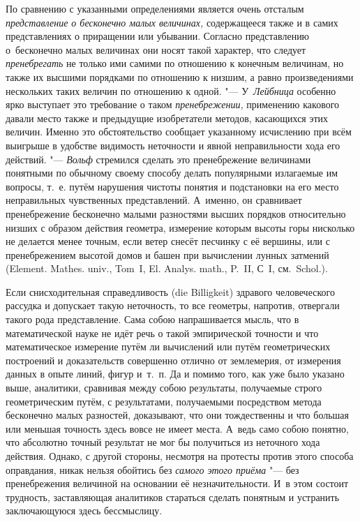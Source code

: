 По сравнению с указанными определениями является очень отсталым
{\em представление о бесконечно малых величинах,} содержащееся также и в самих
представлениях о приращении или убывании. Согласно представлению
о~бесконечно малых величинах они носят такой характер, что следует
{\em пренебрегать} не только ими самими по отношению к конечным величинам, но
также их высшими порядками по отношению к низшим, а равно произведениями
нескольких таких величин по отношению к одной. "--- У~{\em Лейбница} особенно
ярко выступает это требование о таком {\em пренебрежении,} применению какового
давали место также и предыдущие изобретатели методов, касающихся этих величин.
Именно это обстоятельство сообщает указанному исчислению при всём выигрыше в
удобстве видимость неточности и явной неправильности хода его действий. "---
{\em Вольф} стремился сделать это пренебрежение величинами понятными по
обычному своему способу делать популярными излагаемые им вопросы, т.~е. путём
нарушения чистоты понятия и подстановки на его место неправильных чувственных
представлений. А~именно, он сравнивает пренебрежение бесконечно малыми
разностями высших порядков относительно низших с образом действия геометра,
измерение которым высоты горы нисколько не делается менее точным, если ветер
снесёт песчинку с её вершины, или с пренебрежением высотой домов и башен при
вычислении лунных затмений (Ele\-ment. Mathes. univ., Tom~I, El. Ana\-lys.
math., P.~II, С~I, см.~Schol.).

Если снисходительная справедливость (die Billig\-keit) здравого человеческого
рассудка и допускает такую неточность, то все геометры, напротив, отвергали
такого рода представление. Сама собою напрашивается мысль, что в математической
науке не идёт речь о такой эмпирической точности и что математическое измерение
путём ли вычислений или путём геометрических построений и доказательств
совершенно отлично от землемерия, от измерения данных в опыте линий, фигур
и~т.~п. Да и помимо того, как уже было указано выше, аналитики, сравнивая между
собою результаты, получаемые строго геометрическим путём, с результатами,
получаемыми посредством метода бесконечно малых разностей, доказывают, что они
тождественны и что большая или меньшая точность здесь вовсе не имеет места.
А~ведь само собою понятно, что абсолютно точный результат не мог бы получиться
из неточного хода действия. Однако, с другой стороны, несмотря на протесты
против этого способа оправдания, никак нельзя обойтись без
{\em самого этого приёма} "--- без пренебрежения величиной на основании её
незначительности. И~в этом состоит трудность, заставляющая аналитиков стараться
сделать понятным и устранить заключающуюся здесь бессмыслицу.

